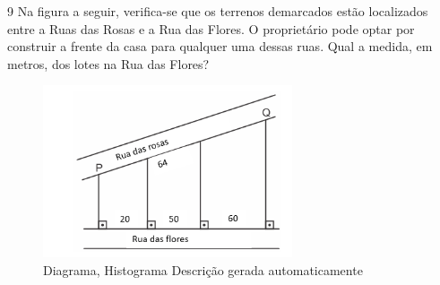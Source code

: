 \begin{escolha}
\begin{boxmedio}
\begin{boxmedio}
{\begin{boxpeq}
\begin{boxpeq}
{\begin{boxpeq}
\begin{boxmedio}
\begin{boxmedio}
\begin{boxpeq}
\begin{boxmedio}
\begin{boxpeq}
\begin{boxpeq}
\begin{boxpeq}
\begin{boxpeq}
\begin{boxmedio}
{\begin{boxmedio}
\begin{boxmedio}
\begin{boxpeq}
\begin{boxmedio}
\begin{boxpeq}
\begin{boxpeq}
\begin{boxpeq}
\begin{escolha}
{\begin{boxmedio}
\begin{boxpeq}
\begin{boxpeq}
\begin{boxpeq}
\begin{boxpeq}
\begin{boxpeq}
\begin{boxmedio}
\begin{boxpeq}
\begin{boxpeq}
\begin{boxpeq}
{\begin{boxpeq}
\begin{boxmedio}
\begin{boxpeq}
\begin{boxpeq}
\begin{boxpeq}
{\begin{boxpeq}
\begin{boxmedio}
{\begin{boxpeq}
\begin{boxpeq}
\begin{boxmedio}
\begin{boxmedio}
\begin{boxpeq}
\begin{boxpeq}
{\begin{boxpeq}
\begin{boxpeq}
\begin{boxpeq}
\begin{boxpeq}
\begin{boxpeq}
\begin{escolha}
\begin{escolha}
{\begin{boxmedio}
\begin{boxpeq}
\begin{q°}
\begin{boxmedio}
\begin{boxpeq}
\begin{boxpeq}
\begin{boxmedio}
\begin{boxmedio}
\begin{boxmedio}

\num{9} Na figura a seguir, verifica-se que os terrenos demarcados estão 
localizados entre a Ruas das Rosas e a Rua das Flores. O proprietário pode 
optar por construir a frente da casa para qualquer uma dessas ruas. Qual a 
medida, em metros, dos lotes na Rua das Flores?

\begin{figure}
\centering
\includegraphics[width=2.89167in,height=1.99596in]{./_SAEB_9_MAT/media/image189.png}
\caption{Diagrama, Histograma Descrição gerada automaticamente}

\end{figure}
\end{boxmedio}
\end{boxmedio}
\end{boxmedio}
\end{boxpeq}
\end{boxpeq}
\end{boxmedio}
\end{q°}
\end{boxpeq}
\end{boxmedio}}
\end{escolha}
\end{escolha}
\end{boxpeq}
\end{boxpeq}
\end{boxpeq}
\end{boxpeq}
\end{boxpeq}}
\end{boxpeq}
\end{boxpeq}
\end{boxmedio}
\end{boxmedio}
\end{boxpeq}
\end{boxpeq}}
\end{boxmedio}
\end{boxpeq}}
\end{boxpeq}
\end{boxpeq}
\end{boxpeq}
\end{boxmedio}
\end{boxpeq}}
\end{boxpeq}
\end{boxpeq}
\end{boxpeq}
\end{boxmedio}
\end{boxpeq}
\end{boxpeq}
\end{boxpeq}
\end{boxpeq}
\end{boxpeq}
\end{boxmedio}}
\end{escolha}
\end{boxpeq}
\end{boxpeq}
\end{boxpeq}
\end{boxmedio}
\end{boxpeq}
\end{boxmedio}
\end{boxmedio}}
\end{boxmedio}
\end{boxpeq}
\end{boxpeq}
\end{boxpeq}
\end{boxpeq}
\end{boxmedio}
\end{boxpeq}
\end{boxmedio}
\end{boxmedio}
\end{boxpeq}}
\end{boxpeq}
\end{boxpeq}}
\end{boxmedio}
\end{boxmedio}
\end{escolha}
